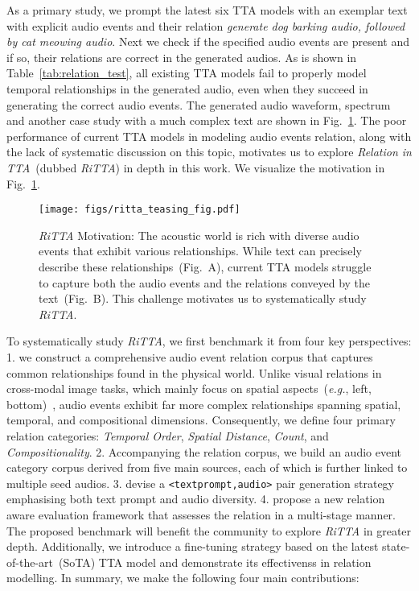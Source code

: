 As a primary study, we prompt the latest six TTA models with an exemplar text with explicit audio events and their relation \textit{generate dog barking audio, followed by cat meowing audio}. Next we check if the specified audio events are present and if so, their relations are correct in the generated audios. As is shown in Table~\ref{tab:relation_test}, all existing TTA models fail to properly model temporal relationships in the generated audio, even when they succeed in generating the correct audio events. The generated audio waveform, spectrum and another case study with a much complex text are shown in Fig.~\ref{fig:teasing_fig}. The poor performance of current TTA models in modeling audio events relation, along with the lack of systematic discussion on this topic, motivates us to explore \emph{Relation in TTA}~(dubbed \emph{RiTTA}) in depth in this work. We visualize the motivation in Fig.~\ref{fig:teasing_fig}.

\begin{figure}[t]
    \centering
    \texttt{[image: figs/ritta\_teasing\_fig.pdf]}
    \vspace{-2mm}
    \caption{\small \emph{RiTTA} Motivation: The acoustic world is rich with diverse audio events that exhibit various relationships. While text can precisely describe these relationships~(Fig.~A), current TTA models struggle to capture both the audio events and the relations conveyed by the text~(Fig.~B). This challenge motivates us to systematically study \emph{RiTTA}.}
    \label{fig:teasing_fig}
    \vspace{-3mm}
\end{figure}

To systematically study \emph{RiTTA}, we first benchmark it from four key perspectives: 1. we construct a comprehensive audio event relation corpus that captures common relationships found in the physical world. Unlike visual relations in cross-modal image tasks, which mainly focus on spatial aspects~(\textit{e.g.}, left, bottom)~\citep{gokhale2022benchmarking}, audio events exhibit far more complex relationships spanning spatial, temporal, and compositional dimensions. Consequently, we define four primary relation categories: \emph{Temporal Order}, \emph{Spatial Distance}, \emph{Count}, and \emph{Compositionality}. 2. Accompanying the relation corpus, we build an audio event category corpus derived from five main sources, each of which is further linked to multiple seed audios. 3. devise a \texttt{<textprompt,audio>} pair generation strategy emphasising both text prompt and audio diversity. 4. propose a new relation aware evaluation framework that assesses the relation in a multi-stage manner. The proposed benchmark will benefit the community to explore \emph{RiTTA} in greater depth. Additionally, we introduce a fine-tuning strategy based on the latest state-of-the-art~(SoTA) TTA model and demonstrate its effectivenss in relation modelling. In summary, we make the following four main contributions:

